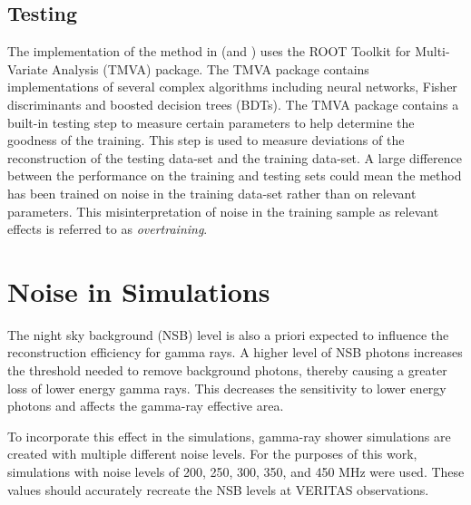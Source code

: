 \documentclass[main.tex]{subfiles}
\begin{document}
\subsection{Testing}
The implementation of the \disp method in \vegas (and \ed) uses the ROOT Toolkit for Multi-Variate Analysis (TMVA) package. The TMVA package contains implementations of several complex algorithms including neural networks, Fisher discriminants and boosted decision trees (BDTs). The TMVA package contains a built-in testing step to measure certain parameters to help determine the goodness of the training. This step is used to measure deviations of the reconstruction of the testing data-set and the training data-set. A large difference between the performance on the training and testing sets could mean the method has been trained on noise in the training data-set rather than on relevant parameters. This misinterpretation of noise in the training sample as relevant effects is referred to as \textit{overtraining}.

\section{Noise in Simulations}
The night sky background (NSB) level is also a priori expected to influence the reconstruction efficiency for gamma rays. A higher level of NSB photons increases the threshold needed to remove background photons, thereby causing a greater loss of lower energy gamma rays. This decreases the sensitivity to lower energy photons and affects the gamma-ray effective area.

To incorporate this effect in the simulations, gamma-ray shower simulations are created with multiple different noise levels. For the purposes of this work, simulations with noise levels of 200, 250, 300, 350, and 450 MHz were used. These values should accurately recreate the NSB levels at VERITAS observations.
\end{document}
